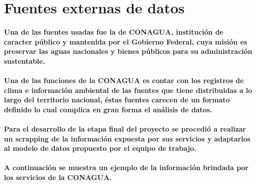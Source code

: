 %
%

\newpage
\section*{Fuentes externas de datos}
\paragraph{Una de las fuentes usadas fue la de \textbf{CONAGUA}, institución de caracter público y mantenida por el Gobierno Federal, cuya misión es preservar las aguas nacionales y bienes públicos para su administración sustentable.}
\paragraph{Una de las funciones de la CONAGUA es contar con los registros de clima e información ambiental de las fuentes que tiene distribuidas a lo largo del territorio nacional, éstas fuentes carecen de un formato definido lo cual complica en gran forma el análisis de datos.\cite{32}}
\paragraph{Para el desarrollo de la etapa final del proyecto se procedió a realizar un scrapping de la información expuesta por sus servicios y adaptarlos al modelo de datos propuesto por el equipo de trabajo.}
\paragraph{A continuación se muestra un ejemplo de la información brindada por los servicios de la CONAGUA.}
 
